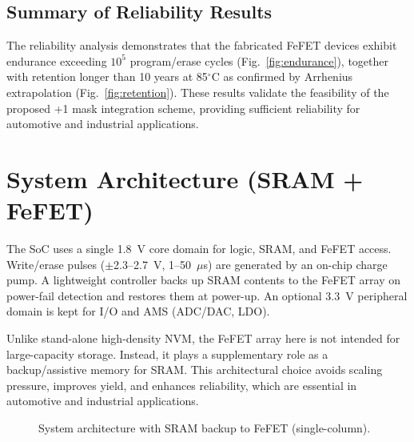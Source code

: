 \documentclass[conference]{IEEEtran}
\begin{document}
\subsection*{Summary of Reliability Results}
The reliability analysis demonstrates that the fabricated FeFET devices
exhibit endurance exceeding $10^5$ program/erase cycles (Fig.~\ref{fig:endurance}),
together with retention longer than 10 years at 85$^\circ$C as confirmed by
Arrhenius extrapolation (Fig.~\ref{fig:retention}).
These results validate the feasibility of the proposed +1 mask integration
scheme, providing sufficient reliability for automotive and industrial
applications.

\section{System Architecture (SRAM + FeFET)}
The SoC uses a single 1.8~V core domain for logic, SRAM, and FeFET access.
Write/erase pulses ($\pm$2.3--2.7~V, 1--50~$\mu$s) are generated by an on-chip charge pump.
A lightweight controller backs up SRAM contents to the FeFET array on power-fail detection and restores them at power-up.
An optional 3.3~V peripheral domain is kept for I/O and AMS (ADC/DAC, LDO).

Unlike stand-alone high-density NVM, the FeFET array here is not intended for large-capacity storage.
Instead, it plays a supplementary role as a backup/assistive memory for SRAM.  
This architectural choice avoids scaling pressure, improves yield, and enhances reliability, which are essential in automotive and industrial applications.

\begin{figure}[!t]
  \centering
  \caption{System architecture with SRAM backup to FeFET (single-column).}
  \label{fig:system}
\end{figure}
\end{document}
